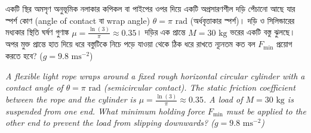 \documentclass[12pt, a4paper]{article}
\begin{document}
\begin{tcolorbox}[questionbox={প্রশ্ন (Question) 1}]
\noindent
একটি স্থির অমসৃণ অনুভূমিক নলাকার কপিকল বা পাইপের ওপর দিয়ে একটি অপ্রসারণশীল দড়ি পেঁচানো আছে যার স্পর্শ কোণ (angle of contact বা wrap angle) $\theta = \pi\text{ rad}$ (অর্ধবৃত্তাকার স্পর্শ)। দড়ি ও সিলিন্ডারের মধ্যকার স্থিতি ঘর্ষণ গুণাঙ্ক $\mu = \frac{\ln(3)}{\pi} \approx 0.35$। দড়ির এক প্রান্তে $M = 30\text{ kg}$ ভরের একটি বস্তু ঝুলছে। অপর মুক্ত প্রান্তে হাত দিয়ে ধরে বস্তুটিকে নিচে পড়ে যাওয়া থেকে ঠিক ধরে রাখতে ন্যূনতম কত বল $F_{\min}$ প্রয়োগ করতে হবে? ($g = 9.8\text{ ms}^{-2}$)

\vspace{0.8em}
\begin{english}
\noindent\textit{\color{darkgray}
A flexible light rope wraps around a fixed rough horizontal circular cylinder with a contact angle of $\theta = \pi\text{ rad}$ (semicircular contact). The static friction coefficient between the rope and the cylinder is $\mu = \frac{\ln(3)}{\pi} \approx 0.35$. A load of $M = 30\text{ kg}$ is suspended from one end. What minimum holding force $F_{\min}$ must be applied to the other end to prevent the load from slipping downwards? ($g = 9.8\text{ ms}^{-2}$)
}
\end{english}
\end{tcolorbox}
\end{document}
